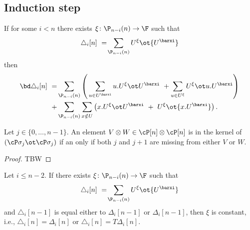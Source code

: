 \subsection{Induction step}

\begin{lemma} \label{l:boundary triangle}
	If for some $i < n$ there exists $\xi \colon \P_{n-i}(n) \to \F$ such that
	\[
	\triangle_i [n]\ =\! \sum_{\P_{n-i}(n)} {U^{\xi}} \ot {U^{\barxi}}
	\]
	then
	\begin{align*}
	\label{equation: boundary of triangle}
	\bd \triangle_i [n]\ = &
	\sum_{\P_{n-i}(n)} \left( \, \sum_{u \in U^\barxi} u.U^\xi \ot U^\barxi \ +
	\sum_{u \in U^\xi} U^\xi \ot u.U^\barxi \right) \\ + &
	\sum_{\P_{n-i}(n)} \sum_{x \notin U} \left( x.U^\xi \ot U^\barxi \ +\ U^\xi \ot {x.U^\barxi} \right).
	\end{align*}
\end{lemma}

\begin{lemma} \label{l:condition to be in the kernel of sxs}
	Let $j \in \{0, \dots, n-1\}$.
	An element $V \otimes W \in \cP[n] \otimes \cP[n]$ is in the kernel of $(\cP \sigma_j \ot \cP \sigma_j)$ if an only if both $j$ and $j+1$ are missing from either $V$ or $W$.
\end{lemma}

\begin{proof}
	TBW
\end{proof}

\begin{lemma}
	Let $i \leq n-2$.
	If there exists $\xi \colon \P_{n-i}(n) \to \F$ such that
	\[
	\triangle_i [n]\ =\! \sum_{\P_{n-i}(n)} {U^{\xi}} \ot {U^{\barxi}}
	\]
	and $\triangle_i [n-1]$ is equal either to $\Delta_i [n-1]$ or $\Delta_i [n-1]$, then $\xi$ is constant, i.e., $\triangle_i [n] = \Delta_i [n]$ or $\triangle_i [n] = T \Delta_i [n]$.
\end{lemma}

